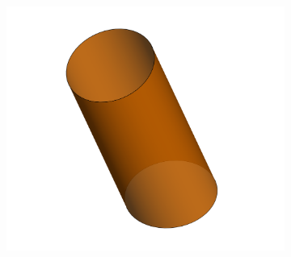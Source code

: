\documentclass[8pt, aspectratio=169]{beamer}
\begin{document}
\begin{frame}
\begin{figure}[H]
\begin{subfigure}{.3\textwidth}
		\end{subfigure}
		\begin{subfigure}{.3\textwidth}
			\includegraphics[width=\textwidth]{../../tec/pinfin/12.png}
		\end{subfigure}
	\end{figure}
	\vfill
\end{frame}
\end{document}
